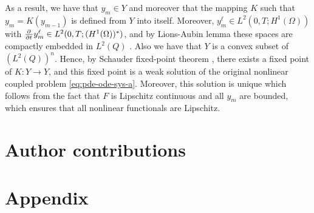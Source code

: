 \documentclass[11pt]{article}
\numberwithin{equation}{section}
\begin{document}
As a result, we have that \(y_m \in Y\) and moreover that the mapping \(K\) such that \( y_m = K(y_{m-1})\) is defined from \(Y \) into itself. Moreover, 
\(y_m^\ell \in L^2(0,T; H^1(\Omega))\) with \(\pd{ }{t} y_m^\ell \in L^2(0,T; (H^1(\Omega))^*)\), and 
by Lions-Aubin lemma these spaces are compactly embedded in \(L^2(Q)\) \cite{Aubin-1963}. Also we have that \(Y\) is a convex subset of \((L^2(Q))^n\). 
Hence, by Schauder fixed-point theorem \cite{Zeidler-1998}, there exists a fixed point of \(K:Y\to Y\), and this fixed point is a weak solution of the original nonlinear coupled problem \eqref{eq:pde-ode-sys-a}. Moreover, this  solution is unique which follows from the fact that \(F\) is Lipschitz continuous and all \(y_m\) are bounded, which ensures that all nonlinear functionals are Lipschitz.































\newpage
\section{Author contributions}

\clearpage
\newpage




% 
\newpage
\nocite{*} 
\printbibliography








\newpage
{}
\appendix
\section*{Appendix}
\renewcommand{\thesubsection}{\Alph{subsection}}
\end{document}
